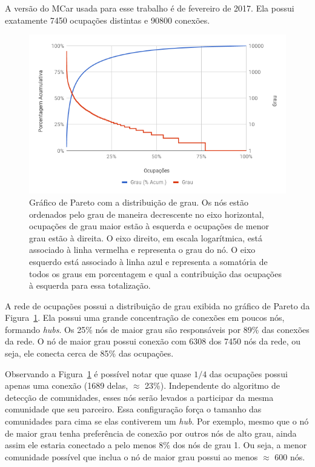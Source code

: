 \documentclass[
  article,
  11pt,
  a4paper,
  english,
  brazil,
  sumario=tradicional]{abntex2}
\begin{document}

A versão do MCar usada para esse trabalho é de fevereiro de 2017. Ela possui exatamente 7450 ocupações distintas e 90800 conexões.

\begin{figure}[htb]
  \centering
  \includegraphics[width=0.9\linewidth]{pareto-ocupacoes.png}
  \caption{Gráfico de Pareto com a distribuição de grau. Os nós estão ordenados pelo grau de maneira decrescente no eixo horizontal, ocupações de grau maior estão à esquerda e ocupações de menor grau estão à direita. O eixo direito, em escala logarítmica, está associado à linha vermelha e representa o grau do nó. O eixo esquerdo está associado à linha azul e representa a somatória de todos os graus em porcentagem e qual a contribuição das ocupações à esquerda para essa totalização.}
  \label{fig:pareto-ocupacoes}
\end{figure}

A rede de ocupações possui a distribuição de grau exibida no gráfico de Pareto da Figura~\ref{fig:pareto-ocupacoes}. Ela possui uma grande concentração de conexões em poucos nós, formando \textit{hubs}. Os 25\% nós de maior grau são responsáveis por 89\% das conexões da rede. O nó de maior grau possui conexão com 6308 dos 7450 nós da rede, ou seja, ele conecta cerca de 85\% das ocupações.

Observando a Figura~\ref{fig:pareto-ocupacoes} é possível notar que quase $1/4$ das ocupações possui apenas uma conexão (1689 delas, $\approx$ 23\%). Independente do algoritmo de detecção de comunidades, esses nós serão levados a participar da mesma comunidade que seu parceiro. Essa configuração força o tamanho das comunidades para cima se elas contiverem um \textit{hub}. Por exemplo, mesmo que o nó de maior grau tenha preferência de conexão por outros nós de alto grau, ainda assim ele estaria conectado a pelo menos 8\% dos nós de grau 1. Ou seja, a menor comunidade possível que inclua o nó de maior grau possui ao menos $\approx$ 600 nós.
\end{document}
